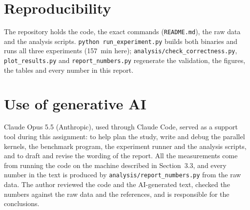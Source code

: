 \documentclass[11pt,a4paper]{article}
\begin{document}
\section*{Reproducibility}

The repository holds the code, the exact commands (\texttt{README.md}), the raw data and the
analysis scripts. \texttt{python run\_experiment.py} builds both binaries and runs all
three experiments (157~min here); \texttt{analysis/check\_correctness.py},
\texttt{plot\_results.py} and \texttt{report\_numbers.py} regenerate the validation, the
figures, the tables and every number in this report.

\section*{Use of generative AI}

Claude Opus 5.5 (Anthropic), used through Claude Code, served as a support tool during this
assignment: to help plan the study, write and debug the parallel kernels, the benchmark
program, the experiment runner and the analysis scripts, and to draft and revise the
wording of the report. All the measurements come from running the code on the machine
described in Section~3.3, and every number in the text is produced by
\texttt{analysis/report\_numbers.py} from the raw data. The author reviewed the code and
the AI-generated text, checked the numbers against the raw data and the references, and is
responsible for the conclusions.
\end{document}

